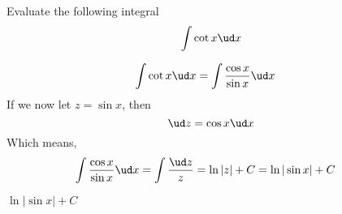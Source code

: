 
\question[3] Evaluate the following integral 
  \[ \int\cot x\ud x \]

\begin{solution}[\halfpage]
  \begin{align}
    \int\cot x\ud x &= \int\dfrac{\cos x}{\sin x}\ud x
  \end{align}
  If we now let $z = \sin x$, then 
  \[ \ud z = \cos x\ud x \]
  Which means, 
  \begin{align}
    \int\dfrac{\cos x}{\sin x}\ud x &= \int\dfrac{\ud z}{z} = \ln\vert z\vert + C = \ln\vert\sin x\vert + C
  \end{align}
\end{solution}

\ifprintanswers\begin{codex}$\ln\vert\sin x\vert + C$\end{codex}\fi
